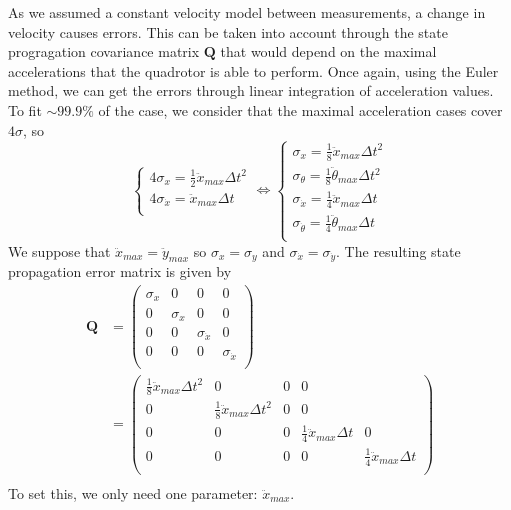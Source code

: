 \documentclass[12pt]{article}
\begin{document}
As we assumed a constant velocity model between measurements, a change in velocity causes errors.
This can be taken into account through the state progragation covariance matrix $\mathbf{Q}$ that would depend on the maximal accelerations that the quadrotor is able to perform.
Once again, using the Euler method, we can get the errors through linear integration of acceleration values.
To fit $\sim 99.9\%$ of the case, we consider that the maximal acceleration cases cover $4\sigma$, so
\begin{equation}
\left\{
    \begin{array}{l}
    4 \sigma_x = \frac{1}{2} \ddot{x}_{max} \Delta{t}^2 \\
    4 \sigma_{\dot{x}} = \ddot{x}_{max} \Delta{t} \\
    \end{array}
\right.
\Leftrightarrow
\left\{
    \begin{array}{l}
    \sigma_x = \frac{1}{8} \ddot{x}_{max} \Delta{t}^2 \\
    \sigma_{\theta} = \frac{1}{8} \ddot{\theta}_{max} \Delta{t}^2 \\
    \sigma_{\dot{x}} = \frac{1}{4} \ddot{x}_{max} \Delta{t} \\
    \sigma_{\dot{\theta}} = \frac{1}{4} \ddot{\theta}_{max} \Delta{t} \\
    \end{array}
\right.
\end{equation}
We suppose that $\ddot{x}_{max} = \ddot{y}_{max}$ so $\sigma_x = \sigma_y$ and $\sigma_{\dot{x}} = \sigma_{\dot{y}}$.
The resulting state propagation error matrix is given by
\begin{equation}
\begin{split}
\mathbf{Q}
    & =
    \begin{pmatrix}
        \sigma_x & 0 & 0 & 0 \\
        0 & \sigma_x & 0 & 0 \\
        0 & 0 & \sigma_{\dot{x}} & 0 \\
        0 & 0 & 0 & \sigma_{\dot{x}} \\
    \end{pmatrix}
    \\
    & =
    \begin{pmatrix}
        \frac{1}{8} \ddot{x}_{max} \Delta{t}^2 & 0 & 0 & 0 & \\
        0 & \frac{1}{8} \ddot{x}_{max} \Delta{t}^2 & 0 & 0 & \\
        0 & 0 & 0 & \frac{1}{4} \ddot{x}_{max} \Delta{t} & 0 \\
        0 & 0 & 0 & 0 & \frac{1}{4} \ddot{x}_{max} \Delta{t} \\
    \end{pmatrix}
    \\
\end{split}
\end{equation}
To set this, we only need one parameter: $\ddot{x}_{max}$.
\end{document}
